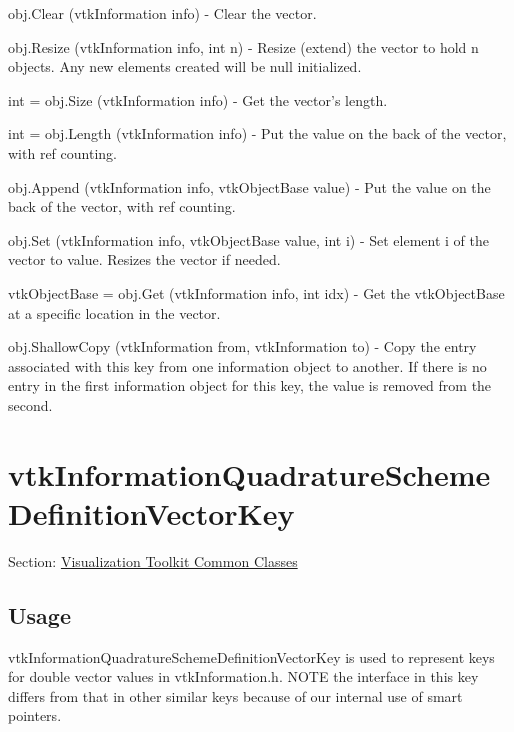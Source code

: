 \begin{DoxyItemize}
\item {\ttfamily obj.\-Clear (vtk\-Information info)} -\/ Clear the vector.  
\item {\ttfamily obj.\-Resize (vtk\-Information info, int n)} -\/ Resize (extend) the vector to hold n objects. Any new elements created will be null initialized.  
\item {\ttfamily int = obj.\-Size (vtk\-Information info)} -\/ Get the vector's length.  
\item {\ttfamily int = obj.\-Length (vtk\-Information info)} -\/ Put the value on the back of the vector, with ref counting.  
\item {\ttfamily obj.\-Append (vtk\-Information info, vtk\-Object\-Base value)} -\/ Put the value on the back of the vector, with ref counting.  
\item {\ttfamily obj.\-Set (vtk\-Information info, vtk\-Object\-Base value, int i)} -\/ Set element i of the vector to value. Resizes the vector if needed.  
\item {\ttfamily vtk\-Object\-Base = obj.\-Get (vtk\-Information info, int idx)} -\/ Get the vtk\-Object\-Base at a specific location in the vector.  
\item {\ttfamily obj.\-Shallow\-Copy (vtk\-Information from, vtk\-Information to)} -\/ Copy the entry associated with this key from one information object to another. If there is no entry in the first information object for this key, the value is removed from the second.  
\end{DoxyItemize}\hypertarget{vtkcommon_vtkinformationquadratureschemedefinitionvectorkey}{}\section{vtk\-Information\-Quadrature\-Scheme\-Definition\-Vector\-Key}\label{vtkcommon_vtkinformationquadratureschemedefinitionvectorkey}
Section\-: \hyperlink{sec_vtkcommon}{Visualization Toolkit Common Classes} \hypertarget{vtkwidgets_vtkxyplotwidget_Usage}{}\subsection{Usage}\label{vtkwidgets_vtkxyplotwidget_Usage}
vtk\-Information\-Quadrature\-Scheme\-Definition\-Vector\-Key is used to represent keys for double vector values in vtk\-Information.\-h. N\-O\-T\-E the interface in this key differs from that in other similar keys because of our internal use of smart pointers.

